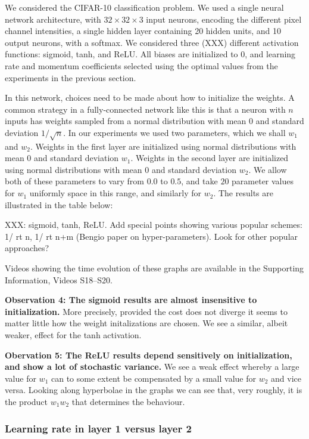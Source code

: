 \documentclass[10pt]{article}
\begin{document}
We considered the CIFAR-10 classification problem.  We used a single
neural network architecture, with $32 \times 32 \times 3$ input
neurons, encoding the different pixel channel intensities, a single
hidden layer containing 20 hidden units, and 10 output neurons, with a
softmax.  We considered three (XXX) different activation functions:
sigmoid, tanh, and ReLU.  All biases are initialized to $0$, and
learning rate and momentum coefficients selected using the optimal
values from the experiments in the previous section.

In this network, choices need to be made about how to initialize the
weights.  A common strategy in a fully-connected network like this is
that a neuron with $n$ inputs has weights sampled from a normal
distribution with mean $0$ and standard deviation $1/\sqrt{n}$.  In
our experiments we used two parameters, which we shall $w_1$ and
$w_2$.  Weights in the first layer are initialized using normal
distributions with mean $0$ and standard deviation $w_1$.  Weights in
the second layer are initialized using normal distributions with mean
$0$ and standard deviation $w_2$.  We allow both of these parameters
to vary from $0.0$ to $0.5$, and take $20$ parameter values for $w_1$
uniformly space in this range, and similarly for $w_2$.  The results
are illustrated in the table below:

XXX: sigmoid, tanh, ReLU.  Add special points showing various popular
schemes: 1/ rt n, 1/ rt n+m (Bengio paper on hyper-parameters).  Look
for other popular approaches?

Videos showing the time evolution of these graphs are available in the
Supporting Information, Videos S18--S20.

\textbf{Observation 4: The sigmoid results are almost insensitive to
  initialization.}  More precisely, provided the cost does not diverge
it seems to matter little how the weight initalizations are chosen.
We see a similar, albeit weaker, effect for the tanh activation.

\textbf{Obervation 5: The ReLU results depend sensitively on
  initialization, and show a lot of stochastic variance.}  We see a
weak effect whereby a large value for $w_1$ can to some extent be
compensated by a small value for $w_2$ and vice versa.  Looking along
hyperbolae in the graphs we can see that, very roughly, it is the
product $w_1 w_2$ that determines the behaviour.

\subsubsection*{Learning rate in layer 1 versus layer 2}
\end{document}
